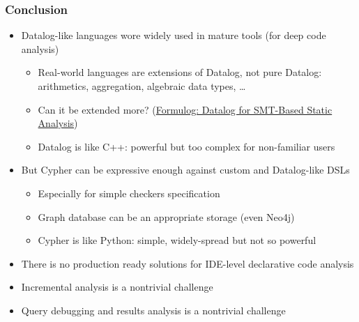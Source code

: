 \documentclass[xcolor=table,aspectratio=169]{beamer}
\begin{document}
\begin{frame}[fragile]
  \frametitle{Conclusion}   
  \begin{itemize}
    \item Datalog-like languages wore widely used in mature tools (for deep code analysis)
    \begin{itemize}
      \item Real-world languages are extensions of Datalog, not pure Datalog: arithmetics, aggregation, algebraic data types, \ldots
      \item Can it be extended more? (\href{https://mgree.github.io/papers/oopsla2020_formulog.pdf}{Formulog: Datalog for SMT-Based Static Analysis})
      \item Datalog is like C++: powerful but too complex for non-familiar users
    \end{itemize}
    \pause
    \item But Cypher can be expressive enough against custom and Datalog-like DSLs
    \begin{itemize}      
      \item Especially for simple checkers specification
      \item Graph database can be an appropriate storage (even Neo4j)
      \item Cypher is like Python: simple, widely-spread but not so powerful
    \end{itemize}
    \pause
    \item There is no production ready solutions for IDE-level declarative code analysis
    \pause
    \item Incremental analysis is a nontrivial challenge
    \pause
    \item Query debugging and results analysis is a nontrivial challenge 
  \end{itemize}
\end{frame}
\end{document}
